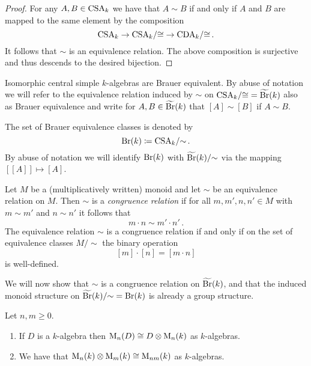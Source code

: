 \begin{proof}
  For any $A, B \in \operatorname{CSA}_k$ we have that $A \sim B$ if and only if $A$ and $B$ are mapped to the same element by the composition
  \[
        \operatorname{CSA}_k
    \to \operatorname{CSA}_k\!/{\cong}
    \to \operatorname{CDA}_k\!/{\cong} \,.
  \]
  It follows that $\sim$ is an equivalence relation.
  The above composition is surjective and thus descends to the desired bijection.
\end{proof}


\begin{remark}
  Isomorphic central simple $k$-algebras are Brauer equivalent.
  By abuse of notation we will refer to the equivalence relation induced by $\sim$ on $\operatorname{CSA}_k\!/{\cong} = \widetilde{\operatorname{Br}}(k)$ also as Brauer equivalence and write for $A, B \in \widetilde{\operatorname{Br}}(k)$ that $[A] \sim [B]$ if $A \sim B$.
\end{remark}


\begin{notation}
  The set of Brauer equivalence classes is denoted by
  \[
              \operatorname{Br}(k)
    \coloneqq  \operatorname{CSA}_k\!/{\sim} \,.
  \]
  By abuse of notation we will identify $\operatorname{Br}(k)$ with $\widetilde{\operatorname{Br}}(k)/{\sim}$ via the mapping $[[A]] \mapsto [A]$.
\end{notation}


\begin{recall}
  Let $M$ be a (multiplicatively written) monoid and let $\sim$ be an equivalence relation on $M$.
  Then $\sim$ is a \emph{congruence relation} if for all $m, m', n, n' \in M$ with $m \sim m'$ and $n \sim n'$ it follows that
  \[
    m \cdot n \sim m' \cdot n' \,.
  \]
  The equivalence relation $\sim$ is a congruence relation if and only if on the set of equivalence classes $M/{\sim}$ the binary operation
  \[
      [m] \cdot [n]
    = [m \cdot n]
  \]
  is well-defined.
\end{recall}


\begin{fluff}
  We will now show that $\sim$ is a congruence relation on $\widetilde{\operatorname{Br}}(k)$, and that the induced monoid structure on $\widetilde{\operatorname{Br}}(k)/{\sim} = \operatorname{Br}(k)$ is already a group structure.
\end{fluff}


\begin{lemma}
  Let $n, m \geq 0$.
  \begin{enumerate}
    \item
      If $D$ is a $k$-algebra then $\operatorname{M}_n(D) \cong D \otimes \operatorname{M}_n(k)$ as $k$-algebras.
    \item
      We have that $\operatorname{M}_n(k) \otimes \operatorname{M}_m(k) \cong \operatorname{M}_{nm}(k)$ as $k$-algebras.
  \end{enumerate}
\end{lemma}


